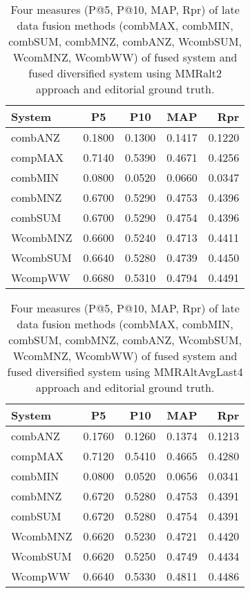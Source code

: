 \begin{table}[H]
\begin{center}
\scriptsize
\caption{Four measures (P@5, P@10, MAP, Rpr) of late data fusion methods (combMAX, combMIN, combSUM, combMNZ, combANZ, WcombSUM, WcomMNZ, WcombWW) of fused system and fused diversified system using MMRalt2 approach and editorial ground truth.}
\label{table:LdfMmralt2}

\begin{tabular}{lcccr}
System & P\@5 & P\@10 & MAP & Rpr \\
\midrule
combANZ & 0.1800 & 0.1300 & 0.1417 & 0.1220 \\
compMAX & 0.7140 & 0.5390 & 0.4671 & 0.4256 \\
combMIN & 0.0800 & 0.0520 & 0.0660 & 0.0347 \\
combMNZ & 0.6700 & 0.5290 & 0.4753 & 0.4396 \\
combSUM & 0.6700 & 0.5290 & 0.4754 & 0.4396 \\
WcombMNZ & 0.6600 & 0.5240 & 0.4713 & 0.4411 \\
WcombSUM & 0.6640 & 0.5280 & 0.4739 & 0.4450 \\
WcompWW & 0.6680 & 0.5310 & 0.4794 & 0.4491 \\
\bottomrule
\end{tabular}
\end{center}
\end{table}


\begin{table}[H]
\begin{center}
\scriptsize
\caption{Four measures (P@5, P@10, MAP, Rpr) of late data fusion methods (combMAX, combMIN, combSUM, combMNZ, combANZ, WcombSUM, WcomMNZ, WcombWW) of fused system and fused diversified system using MMRAltAvgLast4 approach and editorial ground truth.}
\label{table:LdfMmrAvgLast4}

\begin{tabular}{lcccr}
System & P\@5 & P\@10 & MAP & Rpr \\
\midrule
combANZ & 0.1760 & 0.1260 & 0.1374 & 0.1213 \\
compMAX & 0.7120 & 0.5410 & 0.4665 & 0.4280 \\
combMIN & 0.0800 & 0.0520 & 0.0656 & 0.0341 \\
combMNZ & 0.6720 & 0.5280 & 0.4753 & 0.4391 \\
combSUM & 0.6720 & 0.5280 & 0.4754 & 0.4391 \\
WcombMNZ & 0.6620 & 0.5230 & 0.4721 & 0.4420 \\
WcombSUM & 0.6620 & 0.5250 & 0.4749 & 0.4434 \\
WcompWW & 0.6640 & 0.5330 & 0.4811 & 0.4486 \\
 \bottomrule
\end{tabular}
\end{center}
\end{table}

